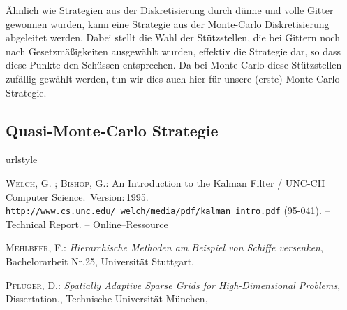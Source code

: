 \documentclass[a4paper,12pt]{llncs}
\numberwithin{equation}{section}
\begin{document}
Ähnlich wie Strategien aus der Diskretisierung durch dünne und volle Gitter gewonnen wurden, kann eine Strategie aus der Monte-Carlo Diskretisierung abgeleitet werden. Dabei stellt die Wahl der Stützstellen, die bei Gittern noch nach Gesetzmäßigkeiten ausgewählt wurden, effektiv die Strategie dar, so dass diese Punkte den Schüssen entsprechen. Da bei Monte-Carlo diese Stützstellen zufällig gewählt werden, tun wir dies auch hier für unsere (erste) Monte-Carlo Strategie. 

\subsection{Quasi-Monte-Carlo Strategie}


\newpage

% 

\begin{thebibliography}{WB95}
	\providecommand{\url}[1]{\texttt{#1}}
	\expandafter\ifx\csname urlstyle\endcsname\relax
	\providecommand{\doi}[1]{doi: #1}\else
	\providecommand{\doi}{doi: \begingroup \urlstyle{rm}\Url}\fi
	
	\textsc{Welch}, G. ; \textsc{Bishop}, G.:
	\newblock An Introduction to the Kalman Filter  / UNC-CH Computer Science.
	\newblock \,Version:\,1995.
	\newblock  \url{http://www.cs.unc.edu/~welch/media/pdf/kalman_intro.pdf}
	(95-041). --
	\newblock Technical Report. --
	\newblock Online--Ressource
	
	\textsc{Mehlbeer}, F.:
	\newblock \textit{Hierarchische Methoden am Beispiel von Schiffe versenken},
	\newblock Bachelorarbeit Nr.25,
	\newblock Universität Stuttgart,
	
	\textsc{Pflüger}, D.:
	\newblock \textit{Spatially Adaptive Sparse Grids for High-Dimensional Problems},
	\newblock Dissertation,,
	\newblock Technische Universität München,
	
\end{thebibliography}


\end{document}

